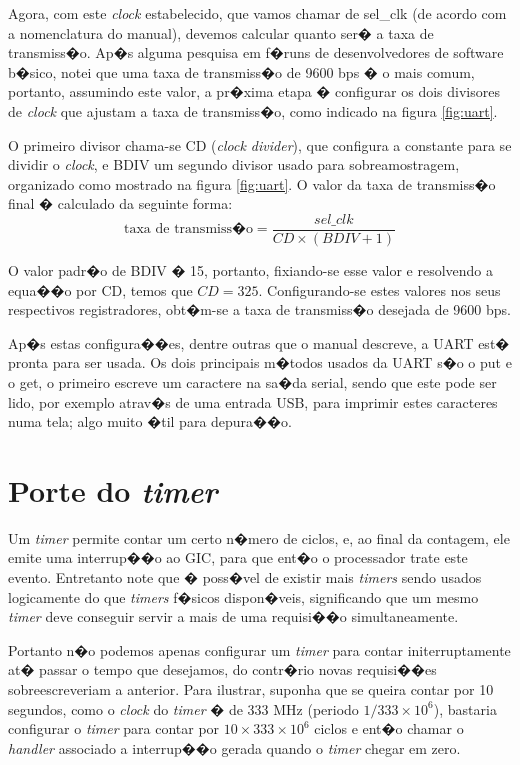 \documentclass{ufscThesis/ufscThesis} %
\begin{document}
Agora, com este \emph{clock} estabelecido, que vamos chamar de sel\_clk (de acordo com a nomenclatura do manual), devemos calcular quanto ser� a taxa de transmiss�o.
Ap�s alguma pesquisa em f�runs de desenvolvedores de software b�sico, notei que uma taxa de transmiss�o de 9600 bps � o mais comum, portanto, assumindo este valor, a pr�xima etapa � configurar os dois divisores de \emph{clock} que ajustam a taxa de transmiss�o, como indicado na figura \ref{fig:uart}.

O primeiro divisor chama-se CD (\emph{clock divider}), que configura a constante para se dividir o \emph{clock}, e BDIV um segundo divisor usado para sobreamostragem, organizado como mostrado na figura \ref{fig:uart}. O valor da taxa de transmiss�o final � calculado da seguinte forma:
\begin{equation}
	\text{taxa de transmiss�o} = \frac{sel\_clk}{CD \times (BDIV+1)}
\end{equation}

O valor padr�o de BDIV � 15, portanto, fixiando-se esse valor e resolvendo a equa��o por CD, temos que $CD = 325$. Configurando-se estes valores nos seus respectivos registradores, obt�m-se a taxa de transmiss�o desejada de 9600 bps.

Ap�s estas configura��es, dentre outras que o manual descreve, a UART est� pronta para ser usada. Os dois principais m�todos usados da UART s�o o put e o get, o primeiro escreve um caractere na sa�da serial, sendo que este pode ser lido, por exemplo atrav�s de uma entrada USB, para imprimir estes caracteres numa tela; algo muito �til para depura��o.

\section{Porte do \emph{timer}}



Um \emph{timer} permite contar um certo n�mero de ciclos, e, ao final da contagem, ele emite uma interrup��o ao GIC, para que ent�o o processador trate este evento. Entretanto note que � poss�vel de existir mais \emph{timers} sendo usados logicamente do que \emph{timers} f�sicos dispon�veis, significando que um mesmo \emph{timer} deve conseguir servir a mais de uma requisi��o simultaneamente.

Portanto n�o podemos apenas configurar um \emph{timer} para contar initerruptamente at� passar o tempo que desejamos, do contr�rio novas requisi��es sobreescreveriam a anterior. Para ilustrar, suponha que se queira contar por 10 segundos, como o \emph{clock} do \emph{timer} � de 333 MHz (periodo $1/333 \times 10^6$), bastaria configurar o \emph{timer} para contar por $10 \times 333 \times 10^6$ ciclos e ent�o chamar o \emph{handler} associado a interrup��o gerada quando o \emph{timer} chegar em zero.
\end{document}
